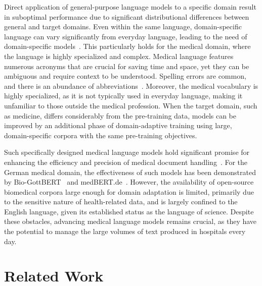 Direct application of general-purpose language models to a specific domain
result in suboptimal performance due to significant distributional differences
between general and target domains. Even within the same language,
domain-specific language can vary significantly from everyday language, leading
to the need of domain-specific models~\cite{arefeva2022tourbert}. This
particularly holds for the medical domain, where the language is highly
specialized and complex. Medical language features numerous acronyms that are
crucial for saving time and space, yet they can be ambiguous and require context
to be understood. Spelling errors are common, and there is an abundance of
abbreviations~\cite{tayefi2021challenges}. Moreover, the medical vocabulary is
highly specialized, as it is not typically used in everyday language, making it
unfamiliar to those outside the medical profession. When the target domain, such
as medicine, differs considerably from the pre-training data, models can be
improved by an additional phase of domain-adaptive training using large,
domain-specific corpora with the same pre-training objectives. 

Such specifically designed medical language models hold significant promise for
enhancing the efficiency and precision of medical document
handling~\cite{beltagy2019scibert, huang2019clinicalbert, peng2019transfer,
lee2020biobert}. For the German medical domain, the effectiveness of such models
has been demonstrated by Bio-GottBERT~\cite{lentzen2022critical} and
medBERT.de~\cite{bressem2024medbert}. However, the availability of open-source
biomedical corpora large enough for domain adaptation is limited, primarily due
to the sensitive nature of health-related data, and is largely confined to the
English language, given its established status as the language of science.
Despite these obstacles, advancing medical language models remains crucial, as
they have the potential to manage the large volumes of text produced in
hospitals every day.

\section{Related Work}

